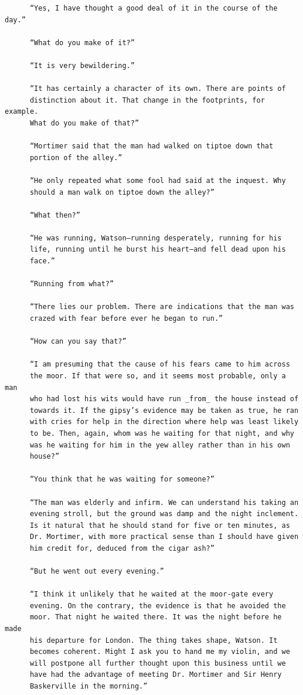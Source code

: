 \documentclass{article}
\begin{document}
\begin{verbatim}
      “Yes, I have thought a good deal of it in the course of the day.”

      “What do you make of it?”

      “It is very bewildering.”

      “It has certainly a character of its own. There are points of
      distinction about it. That change in the footprints, for example.
      What do you make of that?”

      “Mortimer said that the man had walked on tiptoe down that
      portion of the alley.”

      “He only repeated what some fool had said at the inquest. Why
      should a man walk on tiptoe down the alley?”

      “What then?”

      “He was running, Watson—running desperately, running for his
      life, running until he burst his heart—and fell dead upon his
      face.”

      “Running from what?”

      “There lies our problem. There are indications that the man was
      crazed with fear before ever he began to run.”

      “How can you say that?”

      “I am presuming that the cause of his fears came to him across
      the moor. If that were so, and it seems most probable, only a man
      who had lost his wits would have run _from_ the house instead of
      towards it. If the gipsy’s evidence may be taken as true, he ran
      with cries for help in the direction where help was least likely
      to be. Then, again, whom was he waiting for that night, and why
      was he waiting for him in the yew alley rather than in his own
      house?”

      “You think that he was waiting for someone?”

      “The man was elderly and infirm. We can understand his taking an
      evening stroll, but the ground was damp and the night inclement.
      Is it natural that he should stand for five or ten minutes, as
      Dr. Mortimer, with more practical sense than I should have given
      him credit for, deduced from the cigar ash?”

      “But he went out every evening.”

      “I think it unlikely that he waited at the moor-gate every
      evening. On the contrary, the evidence is that he avoided the
      moor. That night he waited there. It was the night before he made
      his departure for London. The thing takes shape, Watson. It
      becomes coherent. Might I ask you to hand me my violin, and we
      will postpone all further thought upon this business until we
      have had the advantage of meeting Dr. Mortimer and Sir Henry
      Baskerville in the morning.”





\end{verbatim}
\end{document}
